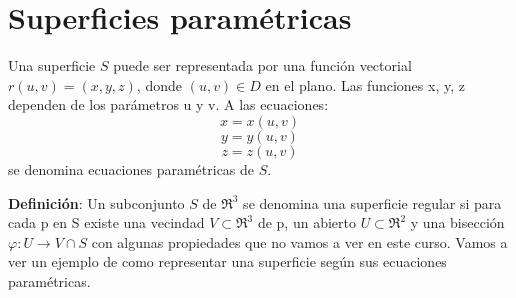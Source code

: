 \section{Superficies paramétricas}

Una superficie $S$ puede ser representada por una función vectorial $r(u,v) = (x, y, z)$, donde $(u,v) \in D$ en el plano. Las funciones x, y, z dependen de los parámetros u y v. A las ecuaciones:
$$x=x(u,v)$$
$$y=y(u,v)$$
$$z=z(u,v)$$
se denomina ecuaciones paramétricas de $S$.

\textbf{Definición}: Un subconjunto $S$ de $\Re^{3}$ se denomina una superficie regular si para cada p en S existe una vecindad $ V \subset \Re^{3} $ de p, un abierto $ U \subset \Re^{2} $ y una bisección $\varphi : U \longrightarrow V \cap S$ con algunas propiedades que no vamos a ver en este curso. Vamos a ver un ejemplo de como representar una superficie según sus ecuaciones paramétricas.

